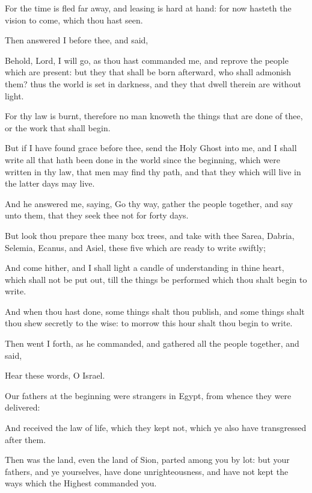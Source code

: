 {\par }{\PP {}For the time is fled far away, and leasing is hard at hand: for now hasteth the vision to come, which thou hast seen.
\par }{\PP {}Then answered I before thee, and said,
\par }{\PP {}Behold, Lord, I will go, as thou hast commanded me, and reprove the people which are present: but they that shall be born afterward, who shall admonish them? thus the world is set in darkness, and they that dwell therein are without light.
\par }{\PP {}For thy law is burnt, therefore no man knoweth the things that are done of thee, or the work that shall begin.
\par }{\PP {}But if I have found grace before thee, send the Holy Ghost into me, and I shall write all that hath been done in the world since the beginning, which were written in thy law, that men may find thy path, and that they which will live in the latter days may live.
\par }{\PP {}And he answered me, saying, Go thy way, gather the people together, and say unto them, that they seek thee not for forty days.
\par }{\PP {}But look thou prepare thee many box trees, and take with thee Sarea, Dabria, Selemia, Ecanus, and Asiel, these five which are ready to write swiftly;
\par }{\PP {}And come hither, and I shall light a candle of understanding in thine heart, which shall not be put out, till the things be performed which thou shalt begin to write.
\par }{\PP {}And when thou hast done, some things shalt thou publish, and some things shalt thou shew secretly to the wise: to morrow this hour shalt thou begin to write.
\par }{\PP {}Then went I forth, as he commanded, and gathered all the people together, and said,
\par }{\PP {}Hear these words, O Israel.
\par }{\PP {}Our fathers at the beginning were strangers in Egypt, from whence they were delivered:
\par }{\PP {}And received the law of life, which they kept not, which ye also have transgressed after them.
\par }{\PP {}Then was the land, even the land of Sion, parted among you by lot: but your fathers, and ye yourselves, have done unrighteousness, and have not kept the ways which the Highest commanded you.
}
